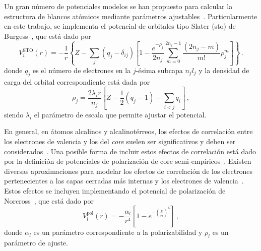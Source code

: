 Un gran número de potenciales modelos se han propuesto para calcular la 
estructura de blancos atómicos mediante parámetros 
ajustables~\cite{Hibbert:82,Gombas:56,Green:69,Klapisch:71,Phillips:59,
Herman:63,Dalgarno:70,Bayliss:77,Cowan:76,Lee:77}. 
Particularmente en este trabajo, se implementa el potencial de orbitales 
tipo Slater (\acs{sto}) de Burgess~\cite{Burgess:89}, que está dado por
\begin{equation}
V_i^{\textrm{STO}}(r)=-\frac{1}{r}\left\{Z-\sum_j(q_j-\delta_{ij})\left[1-
\frac{e^{-\rho_j}}{2n_j}\sum_{m=0}^{2n_j-1}\frac{(2n_j-m)}{m!}\rho_j^m
\right]\right\}\,.
\label{eq:STO-pot}
\end{equation}
donde $q_j$ es el número de electrones en la $j$-ésima subcapa $n_jl_j$
y la densidad de carga del orbital correspondiente está dada por
\begin{equation}
\rho_j= \frac{2\lambda_ir}{n_j}
\left[Z-\frac{1}{2}\left(q_j-1\right)-\sum_{i<j} q_i\right]\,,
\end{equation}
siendo $\lambda_i$ el parámetro de escala que permite ajustar el potencial. 

En general, en átomos alcalinos y alcalinotérreos, los efectos de 
correlación entre los electrones de valencia y los del \textit{core} 
suelen ser significativos y deben ser considerados~\cite{Bartschat:04,
Muller:83}. Una posible forma de incluir estos efectos de correlación 
está dado por la definición de potenciales de polarización de core 
semi-empíricos~\cite{Loughlin:88}. Existen diversas aproximaciones para 
modelar los efectos de correlación de los electrones pertenecientes a 
las capas cerradas más internas y los electrones de 
valencia~\cite{Seaton:72,Loughlin:73,Migdalek:78}. Estos efectos se 
incluyen implementando el potencial de polarización de 
Norcross~\cite{Norcross:76}, que está dado por
\begin{equation*}
 V_l^{\textrm{pol}}(r) = -\frac{\alpha_l}{r^4}\left[1-
e^{-\left(\tfrac{r}{\rho_l}\right)^6}\right]\,,
\label{eq:Norcross-pot}
\end{equation*}
donde $\alpha_l$ es un parámetro correspondiente a la polarizabilidad y 
$\rho_l$ es un parámetro de ajuste.


